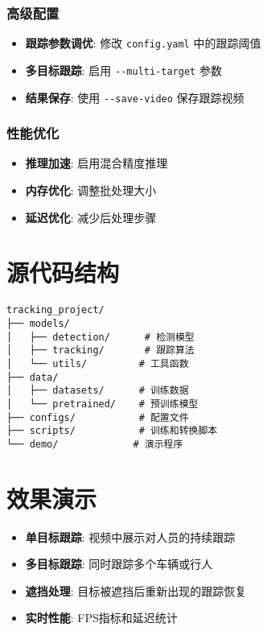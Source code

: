 \subsubsection{高级配置}\label{ux9ad8ux7ea7ux914dux7f6e}

\begin{itemize}
\tightlist
\item
  \textbf{跟踪参数调优}: 修改 \passthrough{\lstinline!config.yaml!}
  中的跟踪阈值
\item
  \textbf{多目标跟踪}: 启用 \passthrough{\lstinline!--multi-target!}
  参数
\item
  \textbf{结果保存}: 使用 \passthrough{\lstinline!--save-video!}
  保存跟踪视频
\end{itemize}

\subsubsection{性能优化}\label{ux6027ux80fdux4f18ux5316}

\begin{itemize}
\tightlist
\item
  \textbf{推理加速}: 启用混合精度推理
\item
  \textbf{内存优化}: 调整批处理大小
\item
  \textbf{延迟优化}: 减少后处理步骤
\end{itemize}

\section{源代码结构}\label{ux6e90ux4ee3ux7801ux7ed3ux6784}

\begin{lstlisting}
tracking_project/
├── models/
│   ├── detection/      # 检测模型
│   ├── tracking/       # 跟踪算法
│   └── utils/         # 工具函数
├── data/
│   ├── datasets/      # 训练数据
│   └── pretrained/    # 预训练模型
├── configs/           # 配置文件
├── scripts/           # 训练和转换脚本
└── demo/             # 演示程序
\end{lstlisting}

\section{效果演示}\label{ux6548ux679cux6f14ux793a}

\begin{itemize}
\tightlist
\item
  \textbf{单目标跟踪}: 视频中展示对人员的持续跟踪
\item
  \textbf{多目标跟踪}: 同时跟踪多个车辆或行人
\item
  \textbf{遮挡处理}: 目标被遮挡后重新出现的跟踪恢复
\item
  \textbf{实时性能}: FPS指标和延迟统计
\end{itemize}
